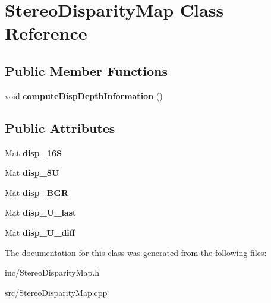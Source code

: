 \hypertarget{class_stereo_disparity_map}{}\section{Stereo\+Disparity\+Map Class Reference}
\label{class_stereo_disparity_map}
\subsection*{Public Member Functions}
\begin{DoxyCompactItemize}
\item 
void {\bfseries compute\+Disp\+Depth\+Information} ()\hypertarget{class_stereo_disparity_map_a291651ed9339e9194b834ff257648ac0}{}\label{class_stereo_disparity_map_a291651ed9339e9194b834ff257648ac0}

\end{DoxyCompactItemize}
\subsection*{Public Attributes}
\begin{DoxyCompactItemize}
\item 
Mat {\bfseries disp\+\_\+16S}\hypertarget{class_stereo_disparity_map_adf19ce1e947a3bb5d53195ec7845c004}{}\label{class_stereo_disparity_map_adf19ce1e947a3bb5d53195ec7845c004}

\item 
Mat {\bfseries disp\+\_\+8U}\hypertarget{class_stereo_disparity_map_a0644f02ace8fb1d4ed5f2d7909238e8b}{}\label{class_stereo_disparity_map_a0644f02ace8fb1d4ed5f2d7909238e8b}

\item 
Mat {\bfseries disp\+\_\+\+B\+GR}\hypertarget{class_stereo_disparity_map_a6bc092b2df0eed2d0b4266ea53abe8ab}{}\label{class_stereo_disparity_map_a6bc092b2df0eed2d0b4266ea53abe8ab}

\item 
Mat {\bfseries disp\+\_\+U\+\_\+last}\hypertarget{class_stereo_disparity_map_ac8ba78cb6770e2812bf1c9daea6b275d}{}\label{class_stereo_disparity_map_ac8ba78cb6770e2812bf1c9daea6b275d}

\item 
Mat {\bfseries disp\+\_\+U\+\_\+diff}\hypertarget{class_stereo_disparity_map_a7e91b4b08e7c0b29840023d9b6026727}{}\label{class_stereo_disparity_map_a7e91b4b08e7c0b29840023d9b6026727}

\end{DoxyCompactItemize}


The documentation for this class was generated from the following files\+:\begin{DoxyCompactItemize}
\item 
inc/Stereo\+Disparity\+Map.\+h\item 
src/Stereo\+Disparity\+Map.\+cpp\end{DoxyCompactItemize}
